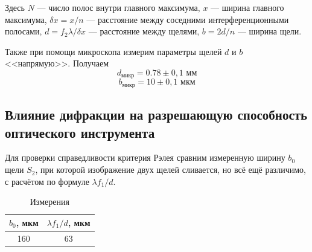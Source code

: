 \documentclass[a4paper,12pt]{article} %
\begin{document}
Здесь $N$ --- число полос внутри главного максимума, $x$ --- ширина главного максимума, $\delta x = x/n$ --- расстояние между соседними интерференционными полосами, $d = f_2 \lambda/\delta x$ --- расстояние между щелями, $b = 2d/n$ --- ширина щели.

Также при помощи микроскопа измерим параметры щелей $ d $ и $ b $ <<напрямую>>. Получаем
\[ d_\text{микр} = 0.78 \pm 0,1 \text{ мм} \]
\[ b_\text{микр} = 10 \pm 0,1 \text{ мкм} \]

\subsection{Влияние дифракции на разрешающую способность оптического инструмента}

Для проверки справедливости критерия Рэлея сравним измеренную ширину $b_0$ щели $S_2$, при которой изображение двух щелей сливается, но всё ещё различимо, с расчётом по формуле $\lambda f_1/d$.

\begin{table}[H]
	\centering
	\caption{Измерения}
	\begin{tabular}{|c|c|} \hline
		$b_0$, мкм &	$\lambda f_1/d$, мкм \\
		\hline
		160 &	63 \\ \hline
	\end{tabular}   
\end{table}
\end{document}
